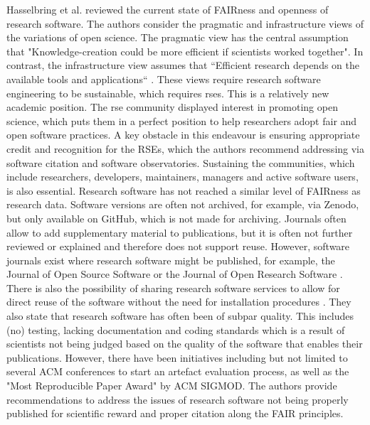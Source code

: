 Hasselbring et al. \cite{hasselbring_fair_2020} reviewed the current state of FAIRness and openness of research software. The authors consider the pragmatic and infrastructure views of the variations of open science. The pragmatic view has the central assumption that "Knowledge-creation could be more efficient if scientists worked together". In contrast, the infrastructure view assumes that “Efficient research depends on the available tools and applications“ \cite{fecher_open_2014}.
These views require research software engineering to be sustainable, which requires \acrshort{rse}s. This is a relatively new academic position. The \acrshort{rse} community displayed interest in promoting open science, which puts them in a perfect position to help researchers adopt \acrshort{fair} and open software practices.
A key obstacle in this endeavour is ensuring appropriate credit and recognition for the RSEs, which the authors recommend addressing via software citation and software observatories. Sustaining the communities, which include researchers, developers, maintainers, managers and active software users, is also essential.
Research software has not reached a similar level of FAIRness as research data. Software versions are often not archived, for example, via Zenodo, but only available on GitHub, which is not made for archiving. Journals often allow to add supplementary material to publications, but it is often not further reviewed or explained and therefore does not support reuse. However, software journals exist where research software might be published, for example, the Journal of Open Source Software or the Journal of Open Research Software \cite{noauthor_journal_nodate, noauthor_journal_nodate-1}. There is also the possibility of sharing research software services to allow for direct reuse of the software without the need for installation procedures \cite{noauthor_binderhub_nodate, noauthor_sobigdataeu_nodate}. They also state that research software has often been of subpar quality. This includes (no) testing, lacking documentation and coding standards which is a result of scientists not being judged based on the quality of the software that enables their publications. However, there have been initiatives including but not limited to several ACM conferences to start an artefact evaluation process, as well as the "Most Reproducible Paper Award" by ACM SIGMOD. The authors provide recommendations to address the issues of research software not being properly published for scientific reward and proper citation along the FAIR principles.
